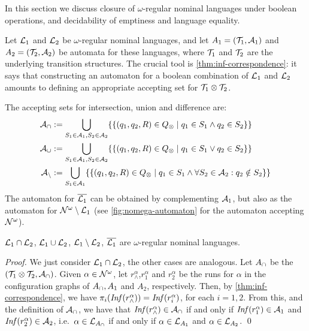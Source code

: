 \newcommand{\compl}[1]{\overline{#1}}
 
In this section we discuss closure of $\omega$-regular nominal languages under boolean operations, and decidability of emptiness and language equality.

Let $\mathcal{L}_1$ and $\mathcal{L}_2$ be $\omega$-regular nominal languages, and let $A_1 = (\mathcal{T}_1,\mathcal{A}_1)$  and $A_2 = (\mathcal{T}_2,\mathcal{A}_2)$ be automata for these languages, where $\mathcal{T}_1$ and $\mathcal{T}_2$ are the underlying transition structures.
The crucial tool is \cref{thm:inf-correspondence}: it says that constructing an automaton for a boolean combination of $\mathcal{L}_1$ and $\mathcal{L}_2$ amounts to defining an appropriate accepting set for $\mathcal{T}_1 \otimes \mathcal{T}_2$.

The accepting sets for intersection, union and difference are:
%
\begin{align*}
	\mathcal{A}_\cap &:= \bigcup_{S_1 \in \mathcal{A}_1,S_2 \in \mathcal{A}_2 } \{\{ (q_1,q_2,R) \in Q_{\otimes} \mid q_1 \in S_1 \land q_2 \in S_2 \}\} 
	\\
	\mathcal{A}_\cup &:= \bigcup_{S_1 \in \mathcal{A}_1,S_2 \in \mathcal{A}_2 } \{\{(q_1,q_2,R) \in Q_{\otimes} \mid q_1 \in S_1 \lor q_2 \in S_2 \}\} 
	\\
	\mathcal{A}_{\setminus} &:= \bigcup_{S_1 \in \mathcal{A}_1} \{\{ (q_1,q_2,R) \in Q_{\otimes} \mid q_1 \in S_1 \land \forall S_2 \in \mathcal{A}_2 : q_2 \notin S_2 \}\}
\end{align*}
%
The automaton for $\compl{\Lang_1}$ can be obtained by complementing $\mathcal{A}_1$, but also as the automaton for $\mathcal{N}^\omega \setminus \mathcal{L}_1$ (see \cref{fig:nomega-automaton} for the automaton accepting $\mathcal{N}^\omega$).


\begin{theorem}
$\mathcal{L}_1 \cap \mathcal{L}_2$, $\mathcal{L}_1 \cup \mathcal{L}_2$, $\mathcal{L}_1 \setminus \mathcal{L}_2$, $\compl{\Lang_1}$ are $\omega$-regular nominal languages.
\label{thm:bool-closure}
\end{theorem}
%
\begin{proof}
We just consider $\mathcal{L}_1 \cap \mathcal{L}_2$, the other cases are analogous. Let $A_\cap$ be the \hdma{} $(\mathcal{T}_1 \otimes \mathcal{T}_2,\mathcal{A}_\cap)$. Given $\alpha \in \mathcal{N}^\omega$, let $r^\alpha_\land$,$r_1^\alpha$ and $r_2^\alpha$ be the runs for $\alpha$ in the configuration graphs of $A_\cap,A_1$ and $A_2$, respectively. Then, by \cref{thm:inf-correspondence}, we have $\pi_i(\mathit{Inf}(r^\alpha_\land)) = \mathit{Inf}(r^\alpha_i)$, for each $i=1,2$. From this, and the definition of $\mathcal{A}_\cap$, we have that $\mathit{Inf}(r^\alpha_\land) \in \mathcal{A}_\cap$ if and only if $\mathit{Inf}(r^\alpha_1) \in \mathcal{A}_1$ and $\mathit{Inf}(r^\alpha_2) \in \mathcal{A}_2$, i.e.\ $\alpha \in \mathcal{L}_{A_\cap}$ if and only if $\alpha \in \mathcal{L}_{A_1}$ and $\alpha \in\mathcal{L}_{A_2}$.
\qed
\end{proof}

